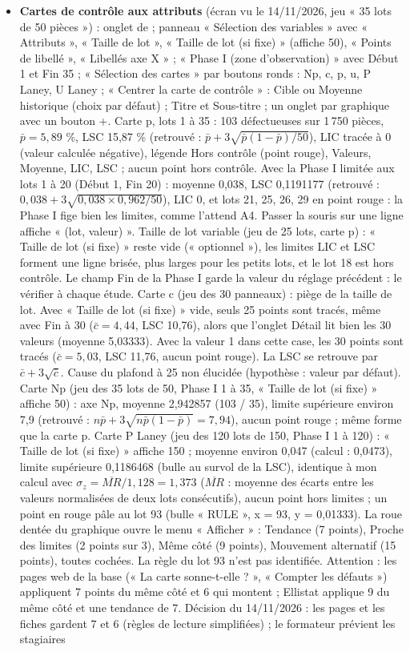 \documentclass[10pt,a4paper]{article}
\begin{document}
\begin{itemize}
\item \textbf{Cartes de contrôle aux attributs} (écran vu le 14/11/2026, jeu « 35 lots de 50 pièces ») : onglet de  ; panneau « Sélection des variables » avec « Attributs », « Taille de lot », « Taille de lot (si fixe) » (affiche 50), « Points de libellé », « Libellés axe X » ; « Phase I (zone d'observation) » avec Début 1 et Fin 35 ; « Sélection des cartes » par boutons ronds : Np, c, p, u, P Laney, U Laney ; « Centrer la carte de contrôle » : Cible ou Moyenne historique (choix par défaut) ; Titre et Sous-titre ; un onglet par graphique avec un bouton +. Carte p, lots 1 à 35 : 103 défectueuses sur 1\,750 pièces, $\bar p = 5{,}89$ \%, LSC 15,87 \% (retrouvé : $\bar p + 3\sqrt{\bar p(1-\bar p)/50}$), LIC tracée à 0 (valeur calculée négative), légende Hors contrôle (point rouge), Valeurs, Moyenne, LIC, LSC ; aucun point hors contrôle. Avec la Phase I limitée aux lots 1 à 20 (Début 1, Fin 20) : moyenne 0,038, LSC 0,1191177 (retrouvé : $0{,}038 + 3\sqrt{0{,}038 \times 0{,}962/50}$), LIC 0, et lots 21, 25, 26, 29 en point rouge : la Phase I fige bien les limites, comme l'attend A4. Passer la souris sur une ligne affiche « (lot, valeur) ». Taille de lot variable (jeu de 25 lots, carte p) : « Taille de lot (si fixe) » reste vide (« optionnel »), les limites LIC et LSC forment une ligne brisée, plus larges pour les petits lots, et le lot 18 est hors contrôle. Le champ Fin de la Phase I garde la valeur du réglage précédent : le vérifier à chaque étude. Carte c (jeu des 30 panneaux) : piège de la taille de lot. Avec « Taille de lot (si fixe) » vide, seuls 25 points sont tracés, même avec Fin à 30 ($\bar c = 4{,}44$, LSC 10,76), alors que l'onglet Détail lit bien les 30 valeurs (moyenne 5,03333). Avec la valeur 1 dans cette case, les 30 points sont tracés ($\bar c = 5{,}03$, LSC 11,76, aucun point rouge). La LSC se retrouve par $\bar c + 3\sqrt{\bar c}$. Cause du plafond à 25 non élucidée (hypothèse : valeur par défaut). Carte Np (jeu des 35 lots de 50, Phase I 1 à 35, « Taille de lot (si fixe) » affiche 50) : axe Np, moyenne 2,942857 (103 / 35), limite supérieure environ 7,9 (retrouvé : $n\bar p + 3\sqrt{n\bar p(1-\bar p)} = 7{,}94$), aucun point rouge ; même forme que la carte p. Carte P Laney (jeu des 120 lots de 150, Phase I 1 à 120) : « Taille de lot (si fixe) » affiche 150 ; moyenne environ 0,047 (calcul : 0,0473), limite supérieure 0,1186468 (bulle au survol de la LSC), identique à mon calcul avec $\sigma_z = \overline{MR}/1{,}128 = 1{,}373$ ($\overline{MR}$ : moyenne des écarts entre les valeurs normalisées de deux lots consécutifs), aucun point hors limites ; un point en rouge pâle au lot 93 (bulle « RULE », x = 93, y = 0,01333). La roue dentée du graphique ouvre le menu « Afficher » : Tendance (7 points), Proche des limites (2 points sur 3), Même côté (9 points), Mouvement alternatif (15 points), toutes cochées. La règle du lot 93 n'est pas identifiée. Attention : les pages web de la base (« La carte sonne-t-elle ? », « Compter les défauts ») appliquent 7 points du même côté et 6 qui montent ; Ellistat applique 9 du même côté et une tendance de 7. Décision du 14/11/2026 : les pages et les fiches gardent 7 et 6 (règles de lecture simplifiées) ; le formateur prévient les stagiaires 
\end{itemize}
\end{document}
